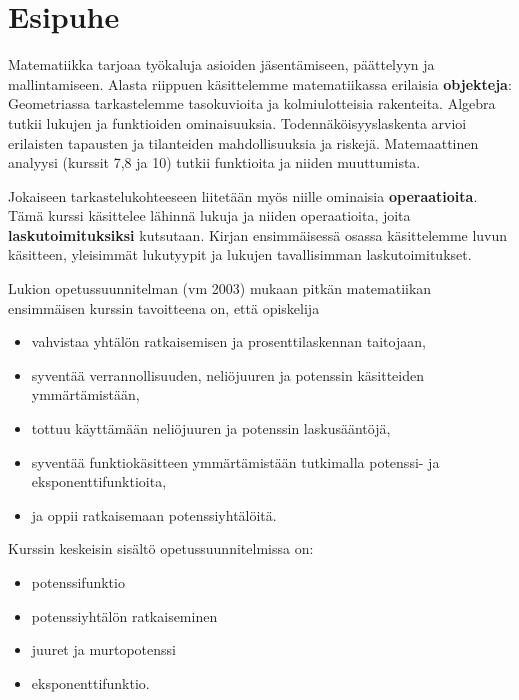 
\chapter{Esipuhe}



Matematiikka tarjoaa työkaluja asioiden jäsentämiseen, päättelyyn ja mallintamiseen. Alasta riippuen käsittelemme matematiikassa erilaisia \textbf{objekteja}: Geometriassa tarkastelemme tasokuvioita ja kolmiulotteisia rakenteita. Algebra tutkii lukujen ja funktioiden ominaisuuksia. Todennäköisyyslaskenta arvioi erilaisten tapausten ja tilanteiden mahdollisuuksia ja riskejä. Matemaattinen analyysi (kurssit 7,8 ja 10) tutkii funktioita ja niiden muuttumista.

Jokaiseen tarkastelukohteeseen liitetään myös niille ominaisia \textbf{operaatioita}. Tämä kurssi käsittelee lähinnä lukuja ja niiden operaatioita, joita \textbf{laskutoimituksiksi} kutsutaan. Kirjan ensimmäisessä osassa käsittelemme luvun käsitteen, yleisimmät lukutyypit ja lukujen tavallisimman laskutoimitukset.

Lukion opetussuunnitelman (vm 2003) mukaan pitkän matematiikan ensimmäisen kurssin tavoitteena on, että opiskelija 
\begin{itemize}
\item vahvistaa yhtälön ratkaisemisen ja prosenttilaskennan taitojaan,
\item syventää verrannollisuuden, neliöjuuren ja potenssin käsitteiden ymmärtämistään,
\item tottuu käyttämään neliöjuuren ja potenssin laskusääntöjä,
\item syventää funktiokäsitteen ymmärtämistään tutkimalla potenssi- ja eksponenttifunktioita,
\item ja oppii ratkaisemaan potenssiyhtälöitä.
\end{itemize}
Kurssin keskeisin sisältö opetussuunnitelmissa on:
\begin{itemize}
\item potenssifunktio
\item potenssiyhtälön ratkaiseminen
\item juuret ja murtopotenssi
\item eksponenttifunktio.
\end{itemize}

